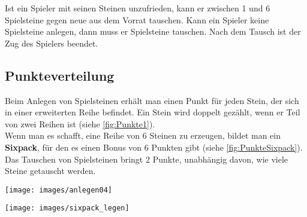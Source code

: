\documentclass[a4paper, ngerman]{scrartcl}
\begin{document}
Ist ein Spieler mit seinen Steinen unzufrieden, kann er zwischen 1 und 6
Spielsteine gegen neue aus dem Vorrat tauschen. Kann ein Spieler keine
Spielsteine anlegen, dann muss er Spielsteine tauschen. Nach dem Tausch ist der
Zug des Spielers beendet.
\newpage
	
 \subsection*{Punkteverteilung}
Beim Anlegen von Spielsteinen erhält man einen Punkt für jeden Stein, der sich in einer erweiterten Reihe befindet. Ein Stein wird doppelt gezählt, wenn er Teil von zwei Reihen ist (siehe \autoref{fig:Punkte1}).\\
Wenn man es schafft, eine Reihe von 6 Steinen zu erzeugen, bildet man ein \textbf{Sixpack}, für den es einen Bonus von 6 Punkten gibt (siehe \autoref{fig:PunkteSixpack}).\\
Das Tauschen von Spielsteinen bringt 2 Punkte, unabhängig davon, wie viele
Steine getauscht werden.
\vspace{15pt}

\begin{minipage}[c]{0.4\textwidth}
	\texttt{[image: images/anlegen04]}
	\label{fig:Punkte1}
\end{minipage}
\hspace{0.1\textwidth}
\begin{minipage}[c]{0.4\textwidth}
	\centering	
	\texttt{[image: images/sixpack\_legen]}
	\label{fig:PunkteSixpack}
\end{minipage}

	
\end{document}
